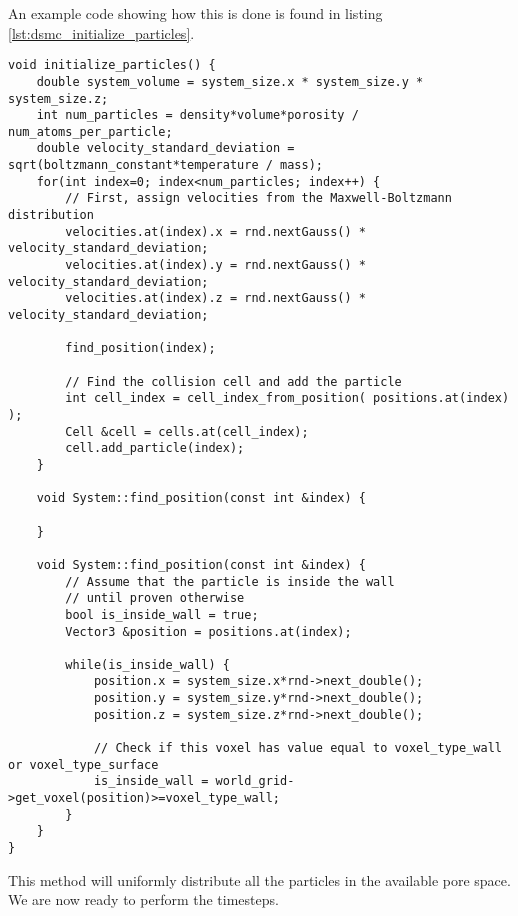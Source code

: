  An example code showing how this is done is found in listing \ref{lst:dsmc_initialize_particles}.
\begin{lstlisting}[caption=Particle initialization., label=lst:dsmc_initialize_particles]
void initialize_particles() {
	double system_volume = system_size.x * system_size.y * system_size.z;
	int num_particles = density*volume*porosity / num_atoms_per_particle;
	double velocity_standard_deviation = sqrt(boltzmann_constant*temperature / mass);
	for(int index=0; index<num_particles; index++) {
		// First, assign velocities from the Maxwell-Boltzmann distribution
		velocities.at(index).x = rnd.nextGauss() * velocity_standard_deviation;
		velocities.at(index).y = rnd.nextGauss() * velocity_standard_deviation;
		velocities.at(index).z = rnd.nextGauss() * velocity_standard_deviation;

		find_position(index);

		// Find the collision cell and add the particle
		int cell_index = cell_index_from_position( positions.at(index) );
		Cell &cell = cells.at(cell_index);
        cell.add_particle(index);
	}

	void System::find_position(const int &index) {

	}

	void System::find_position(const int &index) {
		// Assume that the particle is inside the wall
		// until proven otherwise
	    bool is_inside_wall = true;
	    Vector3 &position = positions.at(index);
	    
	    while(is_inside_wall) {
	        position.x = system_size.x*rnd->next_double();
	        position.y = system_size.y*rnd->next_double();
	        position.z = system_size.z*rnd->next_double();

	        // Check if this voxel has value equal to voxel_type_wall or voxel_type_surface
	        is_inside_wall = world_grid->get_voxel(position)>=voxel_type_wall;
	    }
	}
}
\end{lstlisting}
This method will uniformly distribute all the particles in the available pore space. We are now ready to perform the timesteps.